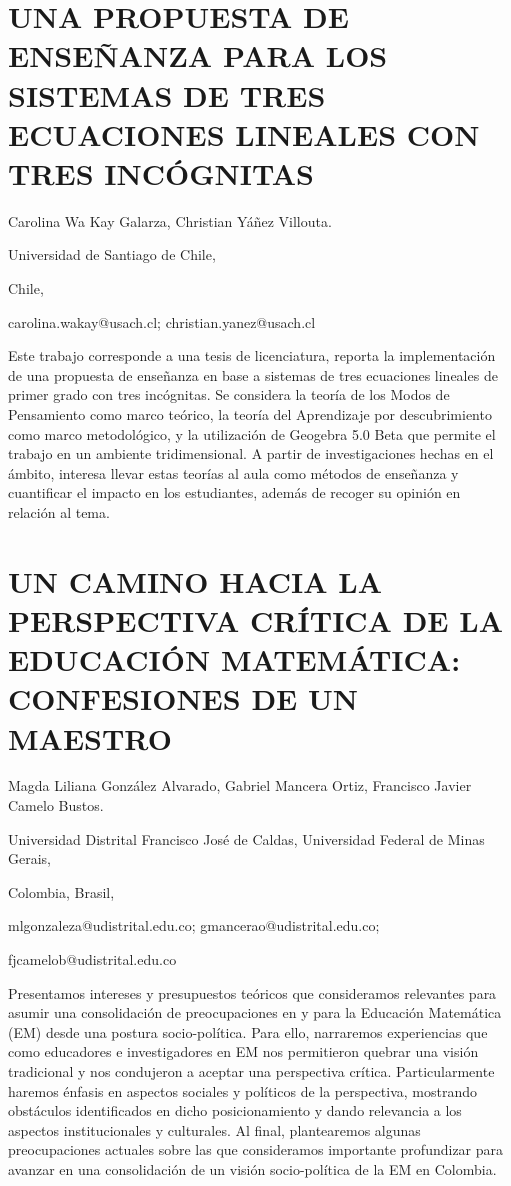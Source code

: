 \section{UNA PROPUESTA DE ENSEÑANZA PARA LOS SISTEMAS DE TRES ECUACIONES LINEALES
CON TRES INCÓGNITAS}

\begin{datos}

Carolina Wa Kay Galarza, Christian Yáñez Villouta.

Universidad de Santiago de Chile,

Chile,

carolina.wakay@usach.cl; christian.yanez@usach.cl 

\end{datos}

Este trabajo corresponde a una tesis de licenciatura, reporta la implementación
de una propuesta de enseñanza en base a sistemas de tres ecuaciones
lineales de primer grado con tres incógnitas. Se considera la teoría
de los Modos de Pensamiento como marco teórico, la teoría del Aprendizaje
por descubrimiento como marco metodológico, y la utilización de Geogebra
5.0 Beta que permite el trabajo en un ambiente tridimensional. A partir
de investigaciones hechas en el ámbito, interesa llevar estas teorías
al aula como métodos de enseñanza y cuantificar el impacto en los
estudiantes, además de recoger su opinión en relación al tema.

\setcounter{section}{177}


\section{UN CAMINO HACIA LA PERSPECTIVA CRÍTICA DE LA EDUCACIÓN MATEMÁTICA:
CONFESIONES DE UN MAESTRO}

\begin{datos}

Magda Liliana González Alvarado, Gabriel Mancera Ortiz, Francisco
Javier Camelo Bustos.

Universidad Distrital Francisco José de Caldas, Universidad Federal
de Minas Gerais,

Colombia, Brasil,

mlgonzaleza@udistrital.edu.co; gmancerao@udistrital.edu.co;

fjcamelob@udistrital.edu.co 

\end{datos}

Presentamos intereses y presupuestos teóricos que consideramos relevantes
para asumir una consolidación de preocupaciones en y para la Educación
Matemática (EM) desde una postura socio-política. Para ello, narraremos
experiencias que como educadores e investigadores en EM nos permitieron
quebrar una visión tradicional y nos condujeron a aceptar una perspectiva
crítica. Particularmente haremos énfasis en aspectos sociales y políticos
de la perspectiva, mostrando obstáculos identificados en dicho posicionamiento
y dando relevancia a los aspectos institucionales y culturales. Al
final, plantearemos algunas preocupaciones actuales sobre las que
consideramos importante profundizar para avanzar en una consolidación
de un visión socio-política de la EM en Colombia.


